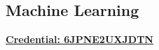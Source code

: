 \subsection{Machine Learning}
\vspace{\topsep}
\href{https://www.coursera.org/account/accomplishments/verify/6JPNE2UXJDTN}{\bf Credential: 6JPNE2UXJDTN}

\sectionspace
